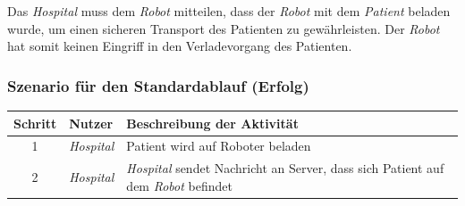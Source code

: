 			Das \emph{Hospital} muss dem \emph{Robot} mitteilen, dass der \emph{Robot} mit dem \emph{Patient} beladen wurde, um einen sicheren Transport des Patienten zu gewährleisten. 
			Der \emph{Robot} hat somit keinen Eingriff in den Verladevorgang des Patienten.

			\subsubsection*{Szenario für den Standardablauf (Erfolg)}

			\begin{table}[H]
				\centering
				\begin{tabularx}{\textwidth}{|c|p{2cm}|X|}
				\hline
				Schritt & Nutzer & Beschreibung der Aktivität \\ \hline
				1 & \emph{Hospital} & Patient wird auf Roboter beladen \\
				2 & \emph{Hospital} & \emph{Hospital} sendet Nachricht an Server, dass sich Patient auf dem \emph{Robot} befindet \\
				\hline
				\end{tabularx}
			\end{table}


	\pagebreak
